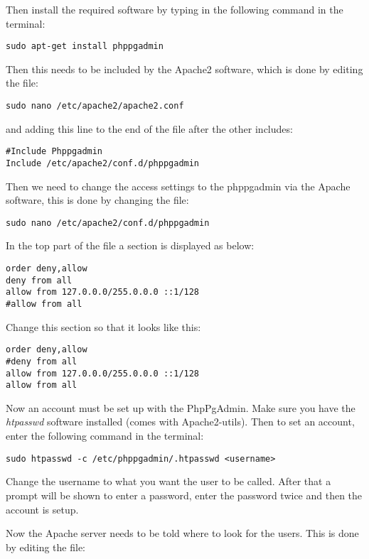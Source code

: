 Then install the required software by typing in the following command in the terminal:

\begin{verbatim}
sudo apt-get install phppgadmin
\end{verbatim}

Then this needs to be included by the Apache2 software, which is done by editing the file:

\begin{verbatim}
sudo nano /etc/apache2/apache2.conf
\end{verbatim}

and adding this line to the end of the file after the other includes:

\begin{verbatim}
#Include Phppgadmin
Include /etc/apache2/conf.d/phppgadmin
\end{verbatim}

Then we need to change the access settings to the phppgadmin via the Apache software, this is done by changing the file:

\begin{verbatim}
sudo nano /etc/apache2/conf.d/phppgadmin
\end{verbatim}
In the top part of the file a section is displayed as below:

\begin{verbatim}
order deny,allow
deny from all
allow from 127.0.0.0/255.0.0.0 ::1/128
#allow from all
\end{verbatim}
Change this section so that it looks like this:
\begin{verbatim}
order deny,allow
#deny from all
allow from 127.0.0.0/255.0.0.0 ::1/128
allow from all
\end{verbatim}

Now an account must be set up with the PhpPgAdmin. Make sure you have the \emph{htpasswd} software installed 
(comes with Apache2-utils). Then to set an account, enter the following command in the terminal:

\begin{verbatim}
sudo htpasswd -c /etc/phppgadmin/.htpasswd <username>
\end{verbatim}
Change the username to what you want the user to be called.
After that a prompt will be shown to enter a password, enter the password twice and then the account is setup.

Now the Apache server needs to be told where to look for the users. This is done by editing the file:


